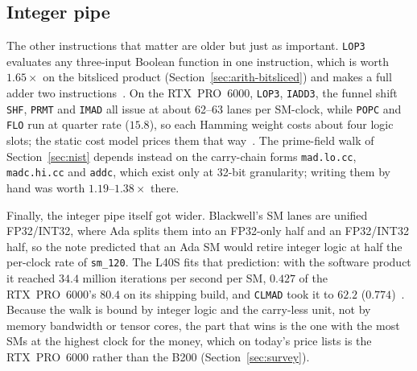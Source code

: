 \subsection{Integer pipe}
\label{sec:blackwell-logic}

The other instructions that matter are older but just as important.
\texttt{LOP3} evaluates any three-input Boolean function in one
instruction, which is worth $1.65\times$ on the bitsliced product
(Section~\ref{sec:arith-bitsliced}) and makes a full adder two
instructions~. On the RTX~PRO~6000,
\texttt{LOP3}, \texttt{IADD3}, the funnel shift \texttt{SHF},
\texttt{PRMT} and \texttt{IMAD} all issue at about 62--63 lanes per
SM-clock, while \texttt{POPC} and \texttt{FLO} run at quarter rate
($15.8$), so each Hamming weight costs about four logic slots; the
static cost model prices them that way~.
The prime-field walk of Section~\ref{sec:nist} depends instead on the
carry-chain forms \texttt{mad.lo.cc}, \texttt{madc.hi.cc} and
\texttt{addc}, which exist only at 32-bit granularity; writing them by
hand was worth $1.19$--$1.38\times$ there.

Finally, the integer pipe itself got wider. Blackwell's SM lanes are
unified FP32/INT32, where Ada splits them into an FP32-only half and an
FP32/INT32 half, so the note predicted that an Ada SM would retire
integer logic at half the per-clock rate of \texttt{sm\_120}. The L40S
fits that prediction: with the software product it reached $34.4$
million iterations per second per SM, $0.427$ of the RTX~PRO~6000's
$80.4$ on its shipping build, and \texttt{CLMAD} took it to $62.2$
($0.774$)~.
Because the walk is bound by integer logic and the carry-less unit, not
by memory bandwidth or tensor cores, the part that wins is the one with
the most SMs at the highest clock for the money, which on today's
price lists is the RTX~PRO~6000 rather than the B200
(Section~\ref{sec:survey}).
